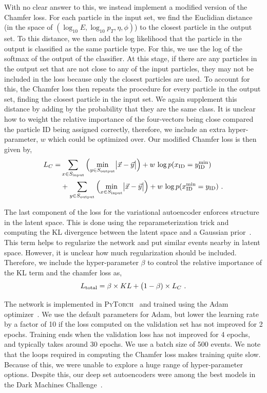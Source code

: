 \documentclass[submission, Phys]{SciPost}
\begin{document}
With no clear answer to this, we instead implement a modified version of the Chamfer loss.
For each particle in the input set, we find the Euclidian distance (in the space of $(\log_{10} E, \log_{10} p_T, \eta, \phi)$) to the closest particle in the output set.
To this distance, we then add the log likelihood that the particle in the output is classified as the same particle type.
For this, we use the log of the softmax of the output of the classifier.
At this stage, if there are any particles in the output set that are not close to any of the input particles, they may not be included in the loss because only the closest particles are used.
To account for this, the Chamfer loss then repeats the procedure for every particle in the output set, finding the closest particle in the input set.
We again supplement this distance by adding by the probability that they are the same class.
It is unclear how to weight the relative importance of the four-vectors being close compared the particle ID being assigned correctly, therefore, we include an extra hyper-parameter, $w$ which could be optimized over.
Our modified Chamfer loss is then given by,
\begin{equation}
\begin{aligned}
    L_C =& \sum_{x \in S_{\rm{input}}} \Big( \underset{y \in S_{\rm{output}}}{\text{min}} \big|\vec{x} - \vec{y}\big|  \Big) + w\, \log p(x_{\rm{ID}} = y_{\rm{ID}}^{\rm{min}}) \\
    &+
    \sum_{y \in S_{\rm{output}}}\Big(  \underset{x \in S_{\rm{input}}}{\text{min}} \big|\vec{x} - \vec{y}\big|  \Big) + w\, \log p(x_{\rm{ID}}^{\rm{min}} = y_{\rm{ID}})  ~.
\end{aligned}
\end{equation}

The last component of the loss for the variational autoencoder enforces structure in the latent space.
This is done using the reparameterization trick and computing the KL divergence between the latent space and a Gaussian prior~\cite{2013arXiv1312.6114K,2015arXiv150505770J}.
This term helps to regularize the network and put similar events nearby in latent space.
However, it is unclear how much regularization should be included.
Therefore, we include the hyper-parameter $\beta$ to control the relative importance of the KL term and the chamfer loss as,
\begin{equation}
    L_{\rm{total}} = \beta \times KL + \big(1 - \beta) \times L_C~.
\end{equation}

The network is implemented in \textsc{PyTorch}~\cite{NEURIPS2019_9015} and trained using the Adam optimizer~\cite{2014arXiv1412.6980K}.
We use the default parameters for Adam, but lower the learning rate by a factor of 10 if the loss computed on the validation set has not improved for 2 epochs.
Training ends when the validation loss has not improved for 4 epochs, and typically takes around 30 epochs.
We use a batch size of 500 events.
We note that the loops required in computing the Chamfer loss makes training quite slow.
Because of this, we were unable to explore a huge range of hyper-parameter options.
Despite this, our deep set autoencoders were among the best models in the Dark Machines Challenge~\cite{Aarrestad:2021oeb}.
\end{document}
